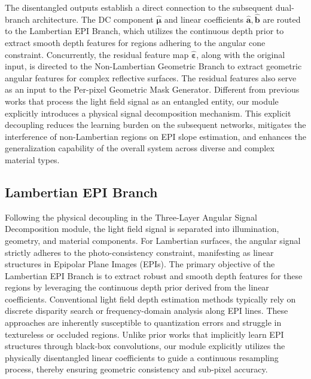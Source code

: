 \documentclass[lettersize,journal]{IEEEtran}
\begin{document}
The disentangled outputs establish a direct connection to the subsequent dual-branch architecture. The DC component $\hat{\boldsymbol{\mu}}$ and linear coefficients $\hat{\mathbf{a}}, \hat{\mathbf{b}}$ are routed to the Lambertian EPI Branch, which utilizes the continuous depth prior to extract smooth depth features for regions adhering to the angular cone constraint. Concurrently, the residual feature map $\hat{\boldsymbol{\varepsilon}}$, along with the original input, is directed to the Non-Lambertian Geometric Branch to extract geometric angular features for complex reflective surfaces. The residual features also serve as an input to the Per-pixel Geometric Mask Generator. Different from previous works that process the light field signal as an entangled entity, our module explicitly introduces a physical signal decomposition mechanism. This explicit decoupling reduces the learning burden on the subsequent networks, mitigates the interference of non-Lambertian regions on EPI slope estimation, and enhances the generalization capability of the overall system across diverse and complex material types.

\subsection{Lambertian EPI Branch}

Following the physical decoupling in the Three-Layer Angular Signal Decomposition module, the light field signal is separated into illumination, geometry, and material components. For Lambertian surfaces, the angular signal strictly adheres to the photo-consistency constraint, manifesting as linear structures in Epipolar Plane Images (EPIs). The primary objective of the Lambertian EPI Branch is to extract robust and smooth depth features for these regions by leveraging the continuous depth prior derived from the linear coefficients. Conventional light field depth estimation methods typically rely on discrete disparity search or frequency-domain analysis along EPI lines. These approaches are inherently susceptible to quantization errors and struggle in textureless or occluded regions. Unlike prior works that implicitly learn EPI structures through black-box convolutions, our module explicitly utilizes the physically disentangled linear coefficients to guide a continuous resampling process, thereby ensuring geometric consistency and sub-pixel accuracy.
\end{document}
